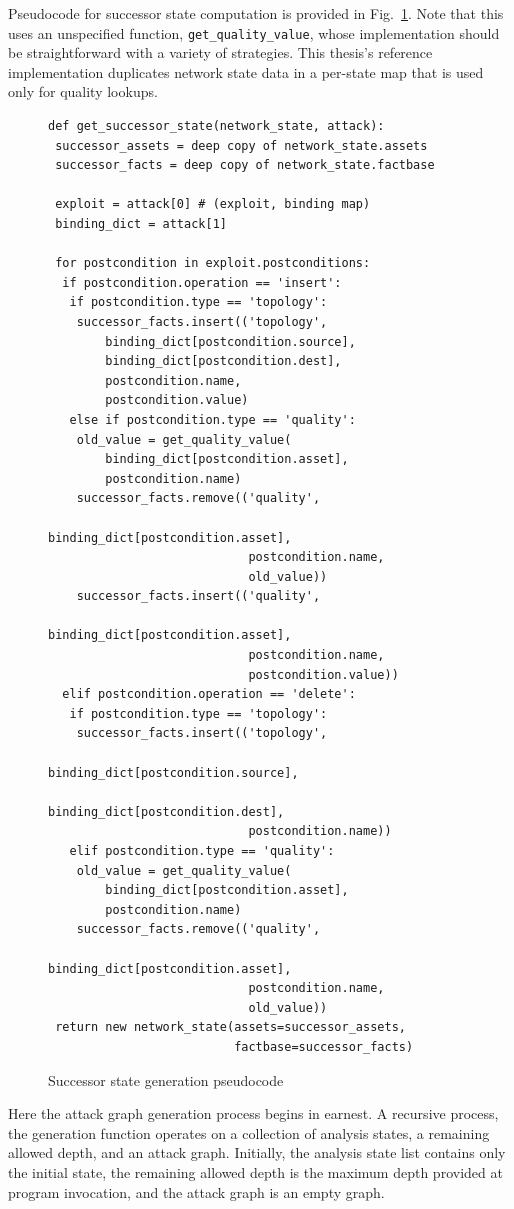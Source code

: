 Pseudocode for successor state computation is provided in 
Fig.~\ref{fig:get_succstate_pc}. Note that this uses an unspecified function,
\texttt{get\_quality\_value}, whose implementation should be straightforward
with a variety of strategies. This thesis's reference implementation duplicates
network state data in a per-state map that is used only for quality lookups.
\begin{figure}
\begin{lstlisting}
def get_successor_state(network_state, attack):
 successor_assets = deep copy of network_state.assets
 successor_facts = deep copy of network_state.factbase
 
 exploit = attack[0] # (exploit, binding map)
 binding_dict = attack[1]
 
 for postcondition in exploit.postconditions:
  if postcondition.operation == 'insert':
   if postcondition.type == 'topology':
    successor_facts.insert(('topology',
        binding_dict[postcondition.source],
        binding_dict[postcondition.dest],
        postcondition.name,
        postcondition.value)
   else if postcondition.type == 'quality':
    old_value = get_quality_value(
        binding_dict[postcondition.asset], 
        postcondition.name)
    successor_facts.remove(('quality',
                            binding_dict[postcondition.asset],
                            postcondition.name,
                            old_value))
    successor_facts.insert(('quality',
                            binding_dict[postcondition.asset],
                            postcondition.name,
                            postcondition.value))
  elif postcondition.operation == 'delete':
   if postcondition.type == 'topology':
    successor_facts.insert(('topology',
                            binding_dict[postcondition.source],
                            binding_dict[postcondition.dest],
                            postcondition.name))
   elif postcondition.type == 'quality':
    old_value = get_quality_value(
        binding_dict[postcondition.asset], 
        postcondition.name)
    successor_facts.remove(('quality',
                            binding_dict[postcondition.asset],
                            postcondition.name,
                            old_value))
 return new network_state(assets=successor_assets,
                          factbase=successor_facts)
\end{lstlisting}
\caption{Successor state generation pseudocode}
\label{fig:get_succstate_pc}
\end{figure}
Here the attack graph generation process begins in earnest. A recursive process,
the generation function operates on a collection of analysis states, a remaining
allowed depth, and an attack graph. Initially, the analysis state
list contains only the initial state, the remaining allowed depth is the maximum
depth provided at program invocation, and the attack graph is an empty graph.

